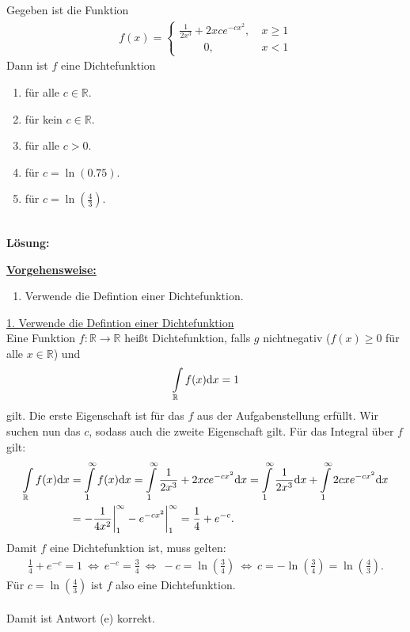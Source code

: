 \subsection*{}
Gegeben ist die Funktion
\begin{align*}
	f(x) =
	\begin{cases}
		\frac{1}{2 x^3} + 2 x c e^{-c x^2}, \ &x \geq 1\\
		\qquad	\ 0 , \ &x < 1
	\end{cases}
\end{align*}
Dann ist $ f $ eine Dichtefunktion
\renewcommand{\labelenumi}{(\alph{enumi})}
\begin{enumerate}
	\item 
	für alle $ c \in \mathbb{R} $.
	\item 
	für kein $ c \in \mathbb{R} $.
	\item 
	für alle $ c > 0 $.
	\item 
	für $ c = \ln(0.75) $.
	\item
	für $ c = \ln\left(\frac{4}{3}\right) $.
\end{enumerate}
\ \\
\textbf{Lösung:}
\begin{mdframed}
\underline{\textbf{Vorgehensweise:}}
\renewcommand{\labelenumi}{\theenumi.}
\begin{enumerate}
\item Verwende die Defintion einer Dichtefunktion.
\end{enumerate}
\end{mdframed}

\underline{1. Verwende die Defintion einer Dichtefunktion}\\
Eine Funktion $ f : \mathbb{R} \to \mathbb{R} $ heißt Dichtefunktion, falls $ g $ nichtnegativ ($ f(x) \geq 0 $ für alle $ x \in \mathbb{R} $) und 
\begin{align*}
	\int \limits_\mathbb{R} f(x) \text{\rmfamily d} x = 1
\end{align*}
gilt.
Die erste Eigenschaft ist für das $ f $  aus der Aufgabenstellung erfüllt.
Wir suchen nun das $ c $, sodass auch die zweite Eigenschaft gilt.
Für das Integral über $ f $ gilt:
\begin{align*}
	\int \limits_\mathbb{R} f(x) \text{\rmfamily d} x
	&=
	\int \limits_1^\infty f(x) \text{\rmfamily d} x
	=
	\int \limits_1^\infty \frac{1}{2x^3} + 2x c e^{-cx^2} \text{\rmfamily d} x
	=
	\int \limits_1^\infty \frac{1}{2x^3} \text{\rmfamily d} x 
	+ 
	\int \limits_1^\infty 2 c x e^{-cx^2} \text{\rmfamily d} x\\
	&=
	-\frac{1}{4x^2} \bigg|_1^\infty
	-
	e^{-cx^2} \bigg|_1^\infty 
	=
	\frac{1}{4} + e^{-c}.
\end{align*}
Damit $ f $ eine Dichtefunktion ist, muss gelten:
\begin{align*}
	\frac{1}{4} + e^{-c} = 1
	\ \Leftrightarrow \
	e^{-c} = \frac{3}{4}
	\ \Leftrightarrow \
	-c = \ln \left(\frac{3}{4}\right)
	\ \Leftrightarrow \
	c = - \ln \left(\frac{3}{4}\right) = \ln \left(\frac{4}{3}\right).
\end{align*}
Für $ c  = \ln \left(\frac{4}{3}\right)$ ist $ f $ also eine Dichtefunktion.\\
\\
Damit ist Antwort (e) korrekt.
 


